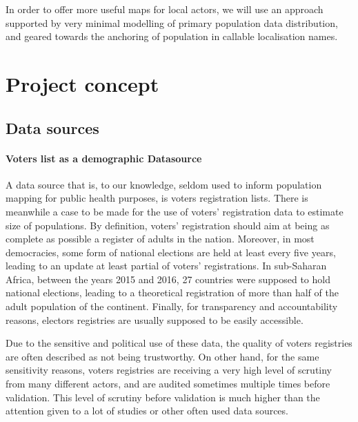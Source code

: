 \documentclass[12pt]{article}\usepackage[]{graphicx}\usepackage[]{color}
\begin{document}

In order to offer more useful maps for local actors, we will use an approach supported by very minimal modelling of primary population data distribution, and geared towards the anchoring of population in callable localisation names.

\section{Project concept}

\subsection{Data sources}

\paragraph{Voters list as a demographic Datasource} A data source that is, to our knowledge, seldom used to inform population mapping for public health purposes, is voters registration lists. There is meanwhile a case to be made for the use of voters' registration data to estimate size of populations. By definition, voters' registration should aim at being as complete as possible a register of adults in the nation. Moreover, in most democracies, some form of national elections are held at least  every five years, leading to an update at least partial of voters' registrations. In sub-Saharan Africa, between the years 2015 and 2016, 27 countries were supposed to hold national elections, leading to a theoretical registration of more than half of the adult population of the continent. Finally, for transparency and accountability reasons, electors registries are usually supposed to be easily accessible.

Due to the sensitive and political use of these data, the quality of voters registries are often described as not being trustworthy. On other hand, for the same sensitivity reasons, voters registries are receiving a very high level of scrutiny from many different actors, and are audited sometimes multiple times before validation. This level of scrutiny before validation is much higher than the attention given to a lot of studies or other often used data sources.
\end{document}
